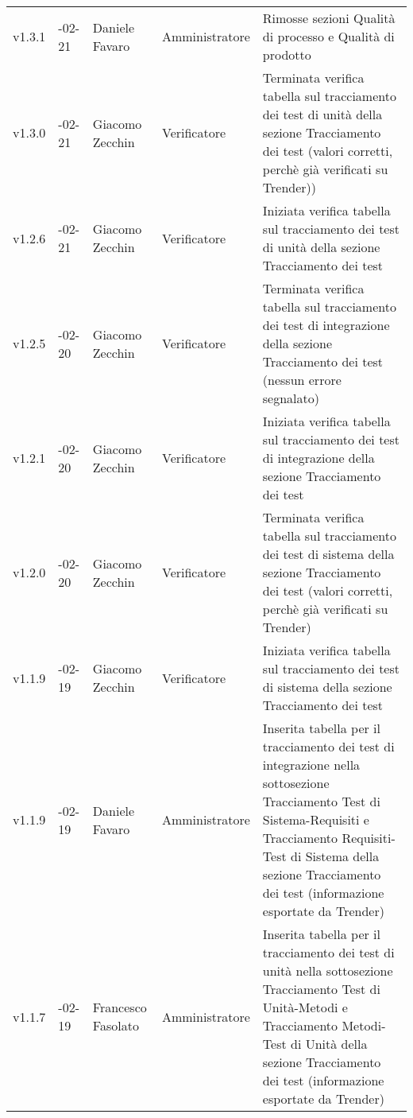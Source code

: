 \begin{longtable} { >{\centering}p{1.4cm} >{\centering}p{2cm} >{\centering}p{2.3cm} >{\centering}p{2.7cm} p{5.5cm} }
	\midrule
	\addlinespace[0.4em]
	v1.3.1 & 2017-02-21 & Daniele Favaro & Amministratore & Rimosse sezioni Qualità di processo e Qualità di prodotto \\
	\addlinespace[0.4em]
	\midrule
	\addlinespace[0.4em]	
	v1.3.0 & 2017-02-21 & Giacomo Zecchin & Verificatore & Terminata verifica tabella sul tracciamento dei test di unità della sezione Tracciamento dei test (valori corretti, perchè già verificati su Trender)) \\ 
	\addlinespace[0.4em]
	\midrule
	\addlinespace[0.4em]
	v1.2.6 & 2017-02-21 & Giacomo Zecchin & Verificatore & Iniziata verifica tabella sul tracciamento dei test di unità della sezione Tracciamento dei test \\ 
	\addlinespace[0.4em]
	\midrule
	\addlinespace[0.4em]
	v1.2.5 & 2017-02-20 & Giacomo Zecchin & Verificatore & Terminata verifica tabella sul tracciamento dei test di integrazione della sezione Tracciamento dei test (nessun errore segnalato) \\ 
	\addlinespace[0.4em]
	\midrule
	\addlinespace[0.4em]
	v1.2.1 & 2017-02-20 & Giacomo Zecchin & Verificatore & Iniziata verifica tabella sul tracciamento dei test di integrazione della sezione Tracciamento dei test \\ 
	\addlinespace[0.4em]
	\midrule
	\addlinespace[0.4em]
	v1.2.0 & 2017-02-20 & Giacomo Zecchin & Verificatore & Terminata verifica tabella sul tracciamento dei test di sistema della sezione Tracciamento dei test (valori corretti, perchè già verificati su Trender) \\ 
	\addlinespace[0.4em]
	\midrule
	\addlinespace[0.4em]
	v1.1.9 & 2017-02-19 & Giacomo Zecchin & Verificatore & Iniziata verifica tabella sul tracciamento dei test di sistema della sezione Tracciamento dei test \\ 
	\addlinespace[0.4em]
	\midrule
	\addlinespace[0.4em]
	v1.1.9 & 2017-02-19 & Daniele Favaro & Amministratore & Inserita tabella per il tracciamento dei test di integrazione nella sottosezione Tracciamento Test di Sistema-Requisiti e Tracciamento Requisiti-Test di Sistema della sezione Tracciamento dei test (informazione esportate da Trender)\\ 
	\addlinespace[0.4em]
	\midrule
	\addlinespace[0.4em]
	v1.1.7 & 2017-02-19 & Francesco Fasolato & Amministratore & Inserita tabella per il tracciamento dei test di unità nella sottosezione Tracciamento Test di Unità-Metodi e Tracciamento Metodi-Test di Unità della sezione Tracciamento dei test (informazione esportate da Trender)\\ 

\end{longtable}
